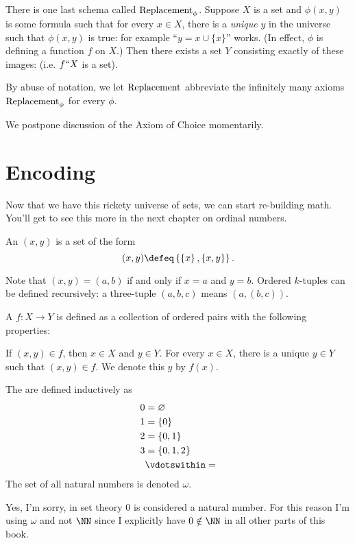 There is one last schema called $\mathrm{Replacement}_\phi$.
Suppose $X$ is a set and $\phi(x,y)$ is some formula
such that for every $x \in X$, there is a \emph{unique} $y$ in the universe
such that $\phi(x,y)$ is true: for example ``$y = x \cup \{x\}$'' works.
(In effect, $\phi$ is defining a function $f$ on $X$.)
Then there exists a set $Y$ consisting exactly of these images:
(i.e. $f``X$ is a set).
\begin{abuse}
	By abuse of notation, we let $\mathrm{Replacement}$ abbreviate
	the infinitely many axioms $\mathrm{Replacement}_\phi$ for every $\phi$.
\end{abuse}

We postpone discussion of the Axiom of Choice momentarily.

\section{Encoding}
Now that we have this rickety universe of sets, we can start re-building math.
You'll get to see this more in the next chapter on ordinal numbers.

\begin{definition}
	An  $(x,y)$
	is a set of the form
	\[ (x,y) \defeq 
		\left\{ \left\{ x \right\}, \left\{ x,y \right\} \right\}. \]
\end{definition}
Note that $(x,y) = (a,b)$ if and only if $x=a$ and $y=b$.
Ordered $k$-tuples can be defined recursively: a three-tuple $(a,b,c)$ means $(a,(b,c))$.

\begin{definition}
	A  $f : X \to Y$ 
	is defined as a collection of ordered pairs
	with the following properties:
	\begin{itemize}
		\ii If $(x,y) \in f$, then $x \in X$ and $y \in Y$.
		\ii For every $x \in X$, there is a unique $y \in Y$
		such that $(x,y) \in f$. We denote this $y$ by $f(x)$.
	\end{itemize}
\end{definition}

\begin{definition}
	The  are defined inductively as
	\begin{align*}
		0 &= \varnothing \\
		1 &= \{0\} \\
		2 &= \{0,1\} \\
		3 &= \{0,1,2\} \\
		&\vdotswithin=
	\end{align*}
	The set of all natural numbers is denoted $\omega$.
\end{definition}
\begin{abuse}
	Yes, I'm sorry, in set theory $0$ is considered a natural number.
	For this reason I'm using $\omega$ and not $\NN$
	since I explicitly have $0\notin\NN$ in all other parts of this book.
\end{abuse}


